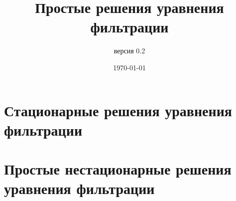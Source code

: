 \documentclass[oneside, openany]{memoir}
\author{версия 0.2}
\title{Простые решения уравнения фильтрации}
\date{\today}
\begin{document}
	
	\maketitle
	
	
	
	\chapter{Стационарные решения уравнения фильтрации}
	
	
	
	
	
	\chapter{Простые нестационарные решения уравнения фильтрации}
	
	
	
	
	
	
	
	\printbibliography
	
	
	
\end{document}
